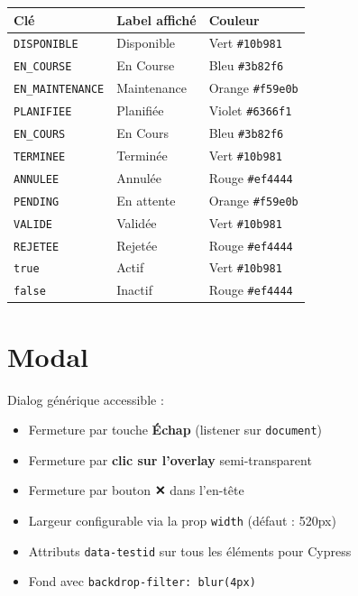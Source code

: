 \documentclass[12pt,a4paper]{report}
\begin{document}
\begin{center}
\begin{tabular}{|l|l|l|}
  \hline
  \rowcolor{lightblue}
  \textbf{Clé} & \textbf{Label affiché} & \textbf{Couleur} \\
  \hline
  \texttt{DISPONIBLE}      & Disponible  & Vert   \texttt{\#10b981} \\
  \texttt{EN\_COURSE}      & En Course   & Bleu   \texttt{\#3b82f6} \\
  \texttt{EN\_MAINTENANCE} & Maintenance & Orange \texttt{\#f59e0b} \\
  \texttt{PLANIFIEE}       & Planifiée   & Violet \texttt{\#6366f1} \\
  \texttt{EN\_COURS}       & En Cours    & Bleu   \texttt{\#3b82f6} \\
  \texttt{TERMINEE}        & Terminée    & Vert   \texttt{\#10b981} \\
  \texttt{ANNULEE}         & Annulée     & Rouge  \texttt{\#ef4444} \\
  \texttt{PENDING}         & En attente  & Orange \texttt{\#f59e0b} \\
  \texttt{VALIDE}          & Validée     & Vert   \texttt{\#10b981} \\
  \texttt{REJETEE}         & Rejetée     & Rouge  \texttt{\#ef4444} \\
  \texttt{true}            & Actif       & Vert   \texttt{\#10b981} \\
  \texttt{false}           & Inactif     & Rouge  \texttt{\#ef4444} \\
  \hline
\end{tabular}
\end{center}

\section{Modal}

Dialog générique accessible :

\begin{itemize}
  \item Fermeture par touche \textbf{Échap} (listener sur \texttt{document})
  \item Fermeture par \textbf{clic sur l'overlay} semi-transparent
  \item Fermeture par bouton \textbf{✕} dans l'en-tête
  \item Largeur configurable via la prop \texttt{width} (défaut : 520px)
  \item Attributs \texttt{data-testid} sur tous les éléments pour Cypress
  \item Fond avec \texttt{backdrop-filter: blur(4px)}
\end{itemize}
\end{document}
